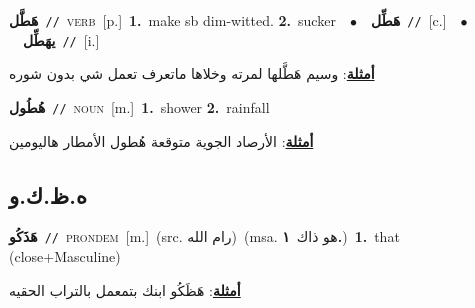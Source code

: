 \documentclass[10pt,a4paper,twoside]{article} %
\begin{document}
\begin{multicols}{2}
{\setlength\topsep{0pt}\textbf{\foreignlanguage{arabic}{هَطَّل}}\ {\color{gray}\texttt{//}\color{black}}\ \textsc{verb}\ [p.]\ \textbf{1.}~make sb dim-witted.  \textbf{2.}~sucker\ \ $\bullet$\ \ \setlength\topsep{0pt}\textbf{\foreignlanguage{arabic}{هَطِّل}}\ {\color{gray}\texttt{//}\color{black}}\ [c.]\ \ $\bullet$\ \ \setlength\topsep{0pt}\textbf{\foreignlanguage{arabic}{يهَطِّل}}\ {\color{gray}\texttt{//}\color{black}}\ [i.]\  \begin{flushright}\color{gray}\foreignlanguage{arabic}{\textbf{\underline{\foreignlanguage{arabic}{أمثلة}}}: وسيم هَطَّلها لمرته وخلاها ماتعرف تعمل شي بدون شوره}\end{flushright}\color{black}} \vspace{2mm}

{\setlength\topsep{0pt}\textbf{\foreignlanguage{arabic}{هُطُول}}\ {\color{gray}\texttt{//}\color{black}}\ \textsc{noun}\ [m.]\ \textbf{1.}~shower  \textbf{2.}~rainfall\  \begin{flushright}\color{gray}\foreignlanguage{arabic}{\textbf{\underline{\foreignlanguage{arabic}{أمثلة}}}: الأرصاد الجوية متوقعة هُطول الأمطار هاليومين}\end{flushright}\color{black}} \vspace{2mm}

\vspace{-3mm}
\subsection*{\color{blue}\foreignlanguage{arabic}{ه.ظ.ك.و}\color{blue}{ (ntws)}} 

{\setlength\topsep{0pt}\textbf{\foreignlanguage{arabic}{هَذَكُو}}\ {\color{gray}\texttt{//}\color{black}}\ \textsc{pron\textunderscore dem}\ [m.]\ (src. \color{gray}\foreignlanguage{arabic}{رام الله}\color{black})\ \color{gray}(msa. \foreignlanguage{arabic}{هو ذاك}~\foreignlanguage{arabic}{\textbf{١.}})\color{black}\ \textbf{1.}~that (close+Masculine)\  \begin{flushright}\color{gray}\foreignlanguage{arabic}{\textbf{\underline{\foreignlanguage{arabic}{أمثلة}}}: هَظَكُو ابنك بتمعمل بالتراب الحقيه}\end{flushright}\color{black}} \vspace{2mm}


\end{multicols}
\end{document}
